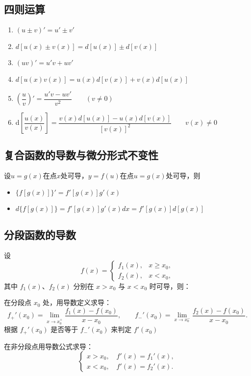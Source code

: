 \documentclass[../book.tex]{subfiles}
\begin{document}
    \subsection{四则运算}

    \begin{enumerate}
        \item $(u \pm v)' = u' \pm v'$
        \item $d[u(x) \pm v(x)] = d[u(x)] \pm d[v(x)]$

        \item $(uv)' = u'v + uv'$
        \item $d[u(x)v(x)] = u(x)d[v(x)] + v(x)d[u(x)]$

        \item $\left(\dfrac{u}{v}\right)'
        = \dfrac{u'v - uv'}{v^2}\qquad (v \neq 0)$
        \item d$\left[\dfrac{u(x)}{v(x)}\right]
        = \dfrac{v(x)d[u(x)] - u(x)d[v(x)]}{[v(x)]^2}\qquad v(x) \neq 0$
    \end{enumerate}

    \subsection{复合函数的导数与微分形式不变性}

    设$u = g(x)$在点$x$处可导，$y = f(u)$在点$u = g(x)$处可导，则
    \begin{itemize}
        \item $\{f[g(x)]\}' = f'[g(x)]g'(x)$
        \item $d\{f[g(x)]\} = f'[g(x)]g'(x)dx = f'[g(x)]d[g(x)]$
    \end{itemize}

    \subsection{分段函数的导数}

    设
    \[
        f(x)=
        \begin{cases}
            f_1(x), & x \ge x_0,\\
            f_2(x), & x < x_0,
        \end{cases}
    \]
    其中 $f_1(x)$、$f_2(x)$ 分别在 $x>x_0$ 与 $x<x_0$ 时可导，则：

    \begin{circlenum}
        \item 在分段点 $x_0$ 处，用导数定义求导：
        \[
            f_+'(x_0)=\lim_{x\to x_0^+}\frac{f_1(x)-f(x_0)}{x-x_0},\qquad
            f_-'(x_0)=\lim_{x\to x_0^-}\frac{f_2(x)-f(x_0)}{x-x_0}.
        \]
        根据 $f_+'(x_0)$ 是否等于 $f_-'(x_0)$ 来判定 $f'(x_0)$

        \item 在非分段点用导数公式求导：
        \[
            \begin{cases}
                x>x_0,\quad f'(x)=f_1'(x),\\
                x<x_0,\quad f'(x)=f_2'(x).
            \end{cases}
        \]
    \end{circlenum}
\end{document}
